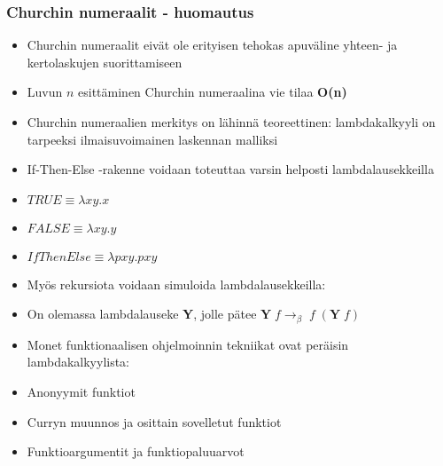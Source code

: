 \documentclass[12pt]{beamer}
\begin{document}
\begin{frame}
\frametitle{Churchin numeraalit - huomautus}
\begin{itemize}

\item Churchin numeraalit eivät ole erityisen tehokas apuväline yhteen- ja kertolaskujen suorittamiseen

\pause
\par
\item Luvun $n$ esittäminen Churchin numeraalina vie tilaa \textbf{O(n)}
\pause
\par
\item Churchin numeraalien merkitys on lähinnä teoreettinen: lambdakalkyyli on tarpeeksi ilmaisuvoimainen laskennan malliksi

\end{itemize}
\end{frame}


\begin{frame}
\begin{itemize}
\frametitle{Controllin ohjaus}

\item If-Then-Else -rakenne voidaan toteuttaa varsin helposti lambdalausekkeilla
\par
\pause

\item $TRUE \equiv \lambda xy . x$
\pause
\item $FALSE \equiv \lambda xy . y$
\pause
\item $IfThenElse \equiv \lambda pxy . pxy$
\pause
\par

\item Myös rekursiota voidaan simuloida lambdalausekkeilla:
\pause
\par
\item On olemassa lambdalauseke \textbf{Y}, jolle pätee $\textbf{Y} \; f \rightarrow_{\beta} \; f \; (\textbf{Y} \; f)$
\end{itemize}
\end{frame}



\begin{frame}
\begin{itemize}
\frametitle{Funktionaalinen ohjelmointi ja lambdakalkyyli}

\item Monet funktionaalisen ohjelmoinnin tekniikat ovat peräisin lambdakalkyylista:
\par
\pause
\item Anonyymit funktiot
\par
\pause
\item Curryn muunnos ja osittain sovelletut funktiot
\par
\pause
\item Funktioargumentit ja funktiopaluuarvot

\end{itemize}
\end{frame}





\end{document}
